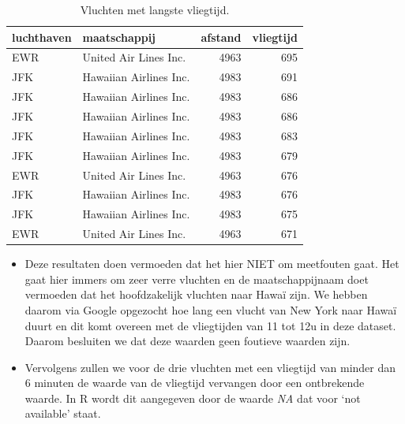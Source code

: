 \documentclass[]{tufte-book}
\begin{document}
\begin{table}

\caption{\label{tab:5-12b}Vluchten met langste vliegtijd.}
\centering
\fontsize{10}{12}\selectfont
\begin{tabular}[t]{llrr}
\toprule
luchthaven & maatschappij & afstand & vliegtijd\\
\midrule
EWR & United Air Lines Inc. & 4963 & 695\\
JFK & Hawaiian Airlines Inc. & 4983 & 691\\
JFK & Hawaiian Airlines Inc. & 4983 & 686\\
JFK & Hawaiian Airlines Inc. & 4983 & 686\\
JFK & Hawaiian Airlines Inc. & 4983 & 683\\
\addlinespace
JFK & Hawaiian Airlines Inc. & 4983 & 679\\
EWR & United Air Lines Inc. & 4963 & 676\\
JFK & Hawaiian Airlines Inc. & 4983 & 676\\
JFK & Hawaiian Airlines Inc. & 4983 & 675\\
EWR & United Air Lines Inc. & 4963 & 671\\
\bottomrule
\end{tabular}
\end{table}

\begin{itemize}
\item
  Deze resultaten doen vermoeden dat het hier NIET om meetfouten gaat. Het gaat hier immers om zeer verre vluchten en de maatschappijnaam doet vermoeden dat het hoofdzakelijk vluchten naar Hawaï zijn. We hebben daarom via Google opgezocht hoe lang een vlucht van New York naar Hawaï duurt en dit komt overeen met de vliegtijden van 11 tot 12u in deze dataset. Daarom besluiten we dat deze waarden geen foutieve waarden zijn.
\item
  Vervolgens zullen we voor de drie vluchten met een vliegtijd van minder dan 6 minuten de waarde van de vliegtijd vervangen door een ontbrekende waarde. In R wordt dit aangegeven door de waarde \emph{NA} dat voor `not available' staat.
\end{itemize}
\end{document}
